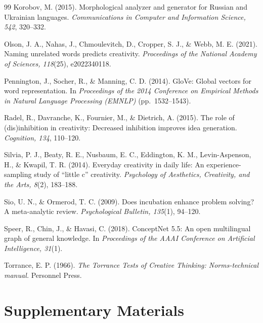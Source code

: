 \documentclass[12pt]{article}
\begin{document}
\begin{thebibliography}{99}
Korobov, M. (2015). Morphological analyzer and generator for Russian and Ukrainian languages. \textit{Communications in Computer and Information Science, 542}, 320--332.

Olson, J. A., Nahas, J., Chmoulevitch, D., Cropper, S. J., \& Webb, M. E. (2021). Naming unrelated words predicts creativity. \textit{Proceedings of the National Academy of Sciences, 118}(25), e2022340118.

Pennington, J., Socher, R., \& Manning, C. D. (2014). GloVe: Global vectors for word representation. In \textit{Proceedings of the 2014 Conference on Empirical Methods in Natural Language Processing (EMNLP)} (pp.\ 1532--1543).

Radel, R., Davranche, K., Fournier, M., \& Dietrich, A. (2015). The role of (dis)inhibition in creativity: Decreased inhibition improves idea generation. \textit{Cognition, 134}, 110--120.

Silvia, P. J., Beaty, R. E., Nusbaum, E. C., Eddington, K. M., Levin-Aspenson, H., \& Kwapil, T. R. (2014). Everyday creativity in daily life: An experience-sampling study of ``little c'' creativity. \textit{Psychology of Aesthetics, Creativity, and the Arts, 8}(2), 183--188.

Sio, U. N., \& Ormerod, T. C. (2009). Does incubation enhance problem solving? A meta-analytic review. \textit{Psychological Bulletin, 135}(1), 94--120.

Speer, R., Chin, J., \& Havasi, C. (2018). ConceptNet 5.5: An open multilingual graph of general knowledge. In \textit{Proceedings of the AAAI Conference on Artificial Intelligence, 31}(1).

Torrance, E. P. (1966). \textit{The Torrance Tests of Creative Thinking: Norms-technical manual.} Personnel Press.

\end{thebibliography}


\clearpage
\appendix
\section{Supplementary Materials}
\end{document}
